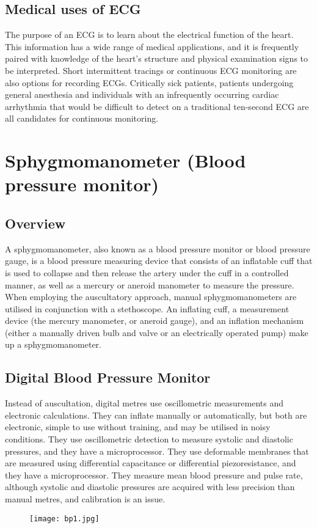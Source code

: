 \documentclass[12pt]{article}
\begin{document}
\subsection{Medical uses of ECG}
The purpose of an ECG is to learn about the electrical function of the heart. This information has a wide range of medical applications, and it is frequently paired with knowledge of the heart's structure and physical examination signs to be interpreted. Short intermittent tracings or continuous ECG monitoring are also options for recording ECGs. Critically sick patients, patients undergoing general anesthesia and individuals with an infrequently occurring cardiac arrhythmia that would be difficult to detect on a traditional ten-second ECG are all candidates for continuous monitoring.
\clearpage

\section{Sphygmomanometer (Blood pressure monitor)}
\subsection{Overview}
A sphygmomanometer, also known as a blood pressure monitor or blood pressure gauge, is a blood pressure measuring device that consists of an inflatable cuff that is used to collapse and then release the artery under the cuff in a controlled manner, as well as a mercury or aneroid manometer to measure the pressure. When employing the auscultatory approach, manual sphygmomanometers are utilised in conjunction with a stethoscope.
An inflating cuff, a measurement device (the mercury manometer, or aneroid gauge), and an inflation mechanism (either a manually driven bulb and valve or an electrically operated pump) make up a sphygmomanometer.
\\
\subsection{Digital Blood Pressure Monitor}
Instead of auscultation, digital metres use oscillometric measurements and electronic calculations. They can inflate manually or automatically, but both are electronic, simple to use without training, and may be utilised in noisy conditions. They use oscillometric detection to measure systolic and diastolic pressures, and they have a microprocessor. They use deformable membranes that are measured using differential capacitance or differential piezoresistance, and they have a microprocessor. They measure mean blood pressure and pulse rate, although systolic and diastolic pressures are acquired with less precision than manual metres, and calibration is an issue.
\\
\begin{figure}[h]
\centering
\texttt{[image: bp1.jpg]}
\label{fig_bp1}
\end{figure}
\\
\end{document}
